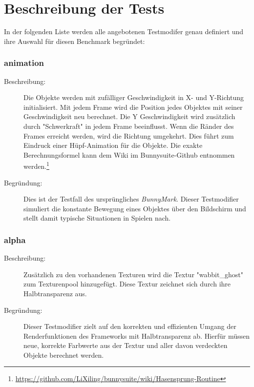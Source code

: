 \section{Beschreibung der Tests}
\label{sec:tests}

In der folgenden Liste werden alle angebotenen Testmodifer genau definiert und ihre Auswahl für diesen Benchmark begründet:

\subsubsection{animation}
\begin{description}
\item[Beschreibung:] Die Objekte werden mit zufälliger Geschwindigkeit in X- und Y-Richtung initialisiert. Mit jedem Frame wird die Position jedes Objektes mit seiner Geschwindigkeit neu berechnet. Die Y Geschwindigkeit wird zusätzlich durch "Schwerkraft" in jedem Frame beeinflusst. Wenn die Ränder des Frames erreicht werden, wird die Richtung umgekehrt. Dies führt zum Eindruck einer Hüpf-Animation für die Objekte. Die exakte Berechnungsformel kann dem Wiki im Bunnysuite-Github entnommen werden.\footnote{\url{https://github.com/LiXiling/bunnysuite/wiki/Hasensprung-Routine}}\\
\item[Begründung:] Dies ist der Testfall des ursprüngliches \textit{BunnyMark}. Dieser Testmodifier simuliert die konstante Bewegung eines Objektes über den Bildschirm und stellt damit typische Situationen in Spielen nach.
\end{description}


\subsubsection{alpha}
\begin{description}
\item[Beschreibung:] Zusätzlich zu den vorhandenen Texturen wird die Textur "wabbit\_ghost" zum Texturenpool hinzugefügt. Diese Textur zeichnet sich durch ihre Halbtransparenz aus. \\                                      
\item[Begründung:] Dieser Testmodifier zielt auf den korrekten und effizienten Umgang der Renderfunktionen des Frameworks mit Halbtransparenz ab. Hierfür müssen neue, korrekte Farbwerte aus der Textur und aller davon verdeckten Objekte berechnet werden.
\end{description} 

